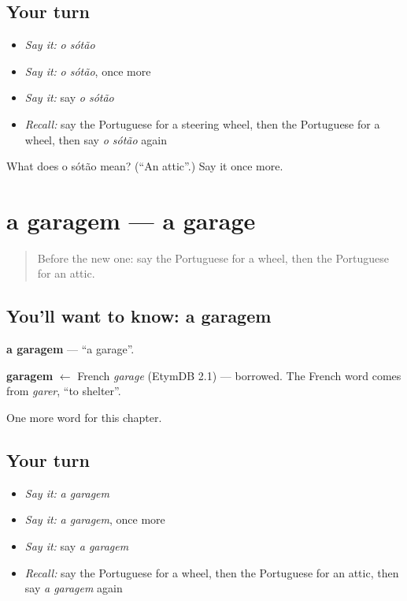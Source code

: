 \subsection*{Your turn}
\begin{itemize}
\raggedright
  \item \emph{Say it:} \emph{o sótão}
  \item \emph{Say it:} \emph{o sótão}, once more
  \item \emph{Say it:} say \emph{o sótão}
  \item \emph{Recall:} say the Portuguese for a steering wheel, then the Portuguese for a wheel, then say \emph{o sótão} again
\end{itemize}

\begin{tcolorbox}[breakable,colback=teal!4,colframe=teal!35!black,title={Before you move on}]
What does o sótão mean? (\textquotedblleft{}An attic\textquotedblright{}.) Say it once more.
\end{tcolorbox}
\section[a garagem]{a garagem — a garage}

\label{lesson:PT-C224-garagem}



\begin{quote}
Before the new one: say the Portuguese for a wheel, then the Portuguese for an attic.
\end{quote}

\subsection*{You'll want to know: a garagem}
\textbf{a garagem} — \textquotedblleft{}a garage\textquotedblright{}.

\begin{cousinweb}
\textbf{garagem} $\leftarrow$ French \emph{garage} (EtymDB 2.1) — borrowed. The French word comes from \emph{garer}, \textquotedblleft{}to shelter\textquotedblright{}.
\end{cousinweb}

\begin{grammarlens}[title={What you've built}]
One more word for this chapter.
\end{grammarlens}

\subsection*{Your turn}
\begin{itemize}
\raggedright
  \item \emph{Say it:} \emph{a garagem}
  \item \emph{Say it:} \emph{a garagem}, once more
  \item \emph{Say it:} say \emph{a garagem}
  \item \emph{Recall:} say the Portuguese for a wheel, then the Portuguese for an attic, then say \emph{a garagem} again
\end{itemize}

